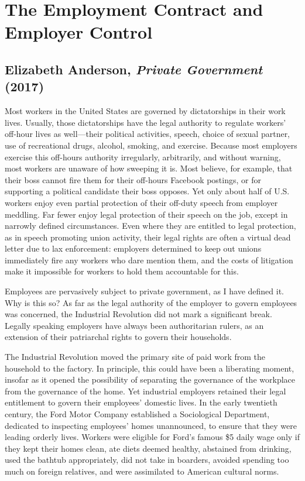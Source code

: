 \documentclass[
  letterpaper,
  11pt,
  DIV=9,
  openright]{scrbook}
\begin{document}
\section{The Employment Contract and Employer
Control}\label{the-employment-contract-and-employer-control}

\subsection{\texorpdfstring{Elizabeth Anderson, \emph{Private
Government}
(2017)}{Elizabeth Anderson, Private Government (2017)}}\label{elizabeth-anderson-private-government-2017}

Most workers in the United States are governed by dictatorships in their
work lives. Usually, those dictatorships have the legal authority to
regulate workers' off-hour lives as well---their political activities,
speech, choice of sexual partner, use of recreational drugs, alcohol,
smoking, and exercise. Because most employers exercise this off-hours
authority irregularly, arbitrarily, and without warning, most workers
are unaware of how sweeping it is. Most believe, for example, that their
boss cannot fire them for their off-hours Facebook postings, or for
supporting a political candidate their boss opposes. Yet only about half
of U.S. workers enjoy even partial protection of their off-duty speech
from employer meddling. Far fewer enjoy legal protection of their speech
on the job, except in narrowly defined circumstances. Even where they
are entitled to legal protection, as in speech promoting union activity,
their legal rights are often a virtual dead letter due to lax
enforcement: employers determined to keep out unions immediately fire
any workers who dare mention them, and the costs of litigation make it
impossible for workers to hold them accountable for this.

Employees are pervasively subject to private government, as I have
defined it. Why is this so? As far as the legal authority of the
employer to govern employees was concerned, the Industrial Revolution
did not mark a significant break. Legally speaking employers have always
been authoritarian rulers, as an extension of their patriarchal rights
to govern their households.

The Industrial Revolution moved the primary site of paid work from the
household to the factory. In principle, this could have been a
liberating moment, insofar as it opened the possibility of separating
the governance of the workplace from the governance of the home. Yet
industrial employers retained their legal entitlement to govern their
employees' domestic lives. In the early twentieth century, the Ford
Motor Company established a Sociological Department, dedicated to
inspecting employees' homes unannounced, to ensure that they were
leading orderly lives. Workers were eligible for Ford's famous \$5 daily
wage only if they kept their homes clean, ate diets deemed healthy,
abstained from drinking, used the bathtub appropriately, did not take in
boarders, avoided spending too much on foreign relatives, and were
assimilated to American cultural norms.
\end{document}
